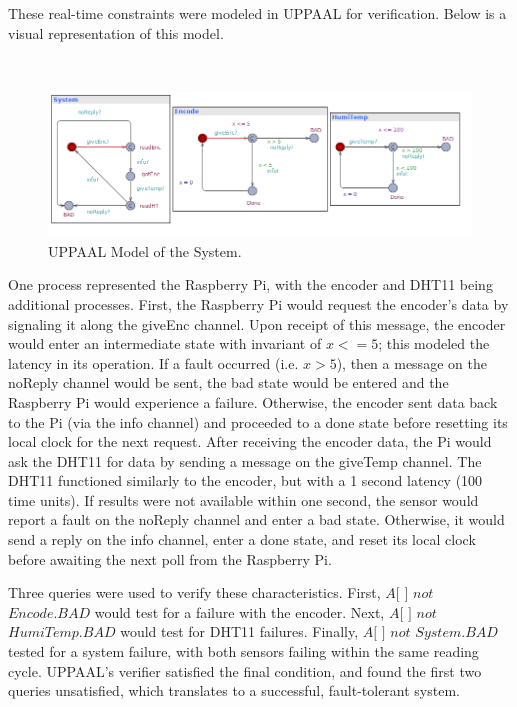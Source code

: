 \documentclass[letterpaper, 12pt]{article}
\begin{document}
\indent These real-time constraints were modeled in UPPAAL for verification.  Below is a visual representation of this model.

~\newline 
\begin{figure}[H]
	\centering
	\includegraphics[width=18cm,keepaspectratio]{system.png}
	\caption[Model]{UPPAAL Model of the System.}
	\label{fig:model}
\end{figure}

\indent One process represented the Raspberry Pi, with the encoder and DHT11 being additional processes.  First, the Raspberry Pi would request the encoder's data by signaling it along the giveEnc channel.  Upon receipt of this message, the encoder would enter an intermediate state with invariant of $x <= 5$; this modeled the latency in its operation.  If a fault occurred (i.e. $x > 5$), then a message on the noReply channel would be sent, the bad state would be entered and the Raspberry Pi would experience a failure.  Otherwise, the encoder sent data back to the Pi (via the info channel) and proceeded to a done state before resetting its local clock for the next request.  After receiving the encoder data, the Pi would ask the DHT11 for data by sending a message on the giveTemp channel.  The DHT11 functioned similarly to the encoder, but with a 1 second latency (100 time units).  If results were not available within one second, the sensor would report a fault on the noReply channel and enter a bad state.  Otherwise, it would send a reply on the info channel, enter a done state, and reset its local clock before awaiting the next poll from the Raspberry Pi.

\indent Three queries were used to verify these characteristics.  First, $A[$ $]$ $not$ $Encode.BAD$ would test for a failure with the encoder.  Next, $A[$ $]$ $not$ $HumiTemp.BAD$ would test for DHT11 failures.  Finally, $A[$ $]$  $not$ $System.BAD$ tested for a system failure, with both sensors failing within the same reading cycle.  UPPAAL's verifier satisfied the final condition, and found the first two queries unsatisfied, which translates to a successful, fault-tolerant system.
\end{document}
